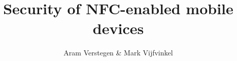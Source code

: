 \documentclass[runningheads,a4paper]{llncs}
\begin{document}
\newcommand{\mytitle}{Security of NFC-enabled mobile devices}
\newcommand{\myauthor}{Aram Verstegen \& Mark Vijfvinkel}
\newcommand{\mycourse}{Research \& Development - Research 1}
\author{\myauthor}
\title{\mytitle}
\maketitle





\setcounter{page}{1}








\newpage

%




\end{document}
